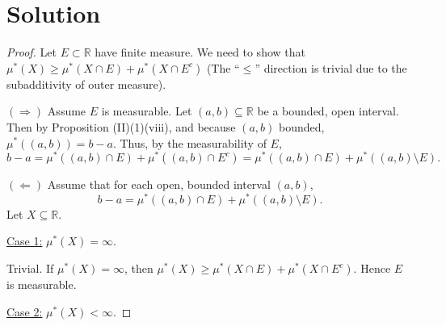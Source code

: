 \documentclass[12pt]{article}
\begin{document}
\section*{Solution}
\begin{proof}
Let $E\subset \mathbb{R}$ have finite measure. We need to show that $\mu^{*}(X) \geq \mu^{*}(X\cap E) + \mu^{*}(X\cap E^{c})$ (The ``$\leq$'' direction
is trivial due to the subadditivity of outer measure).

$(\Rightarrow)$ Assume $E$ is measurable. Let $(a,b) \subseteq \mathbb{R}$ be a bounded, open
interval. Then by Proposition (II)(1)(viii), and because $(a,b)$ bounded, $\mu^{*}\left( (a,b) \right) = b - a$. Thus, by the measurability of $E$,
\[ b - a = \mu^{*}\left( (a,b) \cap E \right) + \mu^{*}\left( (a,b) \cap E^{c} \right) = \mu^{*}\left( (a,b) \cap E \right) + \mu^{*}\left(
(a,b)\setminus E \right). \]

$(\Leftarrow)$ Assume that for each open, bounded interval $(a,b)$, 
\begin{equation}
b - a = \mu^{*}\left( (a,b) \cap E \right) + \mu^{*}\left( (a,b) \setminus E
\right).
\label{eqn:5.0}
\end{equation}
Let $X \subseteq \mathbb{R}$.

\underline{Case 1:} $\mu^{*}(X) = \infty$.

Trivial. If $\mu^{*}(X) = \infty$, then $\mu^{*}(X) \geq \mu^{*}(X\cap E) + \mu^{*}(X\cap E^{c})$. Hence $E$ is measurable.

\underline{Case 2:} $\mu^{*}(X) < \infty$.


\end{proof}
\end{document}
